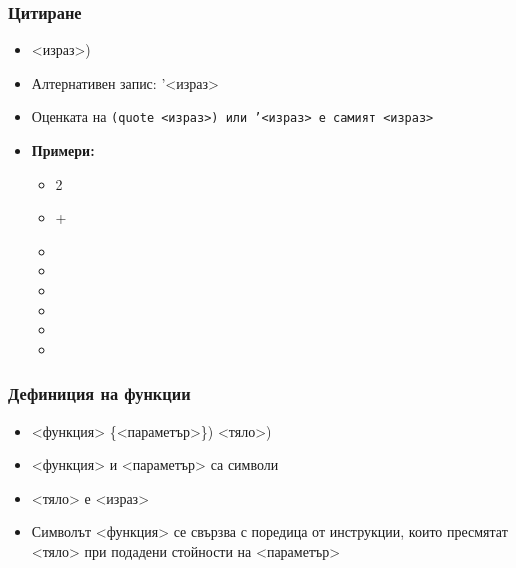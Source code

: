 \documentclass{beamer}
\begin{document}
\begin{frame}
  \frametitle{Цитиране}

  \begin{itemize}[<+->]
  \item {} <израз>\tta)
  \item Алтернативен запис: \tta'<израз>
  \item Оценката на \tt{(quote} <израз>\tt) или \tt'{}<израз> е самият <израз>
  \item \textbf{Примери:}
    \begin{itemize}
    \item {}2
    \item {}+
    \item {}
    \item {}
    \item {}
    \item {}
    \item {}
    \item {}
    \end{itemize}
  \end{itemize}
\end{frame}

\begin{frame}
  \frametitle{Дефиниция на функции}

  \begin{itemize}[<+->]
  \item {}<функция> \{{}<параметър>\}\tta) <тяло>\tta)
  \item {}<функция> и <параметър> са символи
  \item {}<тяло> е <израз>
  \item Символът <функция> се свързва с поредица от инструкции, които пресмятат <тяло> при подадени стойности на <параметър>
  \end{itemize}
\end{frame}
\end{document}
